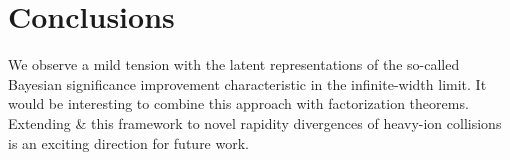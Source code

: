 \section{Conclusions}\label{sec:conclusions}

We observe a mild tension with the latent representations of the
so-called Bayesian significance improvement characteristic in the
infinite-width limit. It would be interesting to combine this approach
with factorization theorems. Extending & this framework to novel rapidity
divergences of heavy-ion collisions is an exciting direction for future
work.


